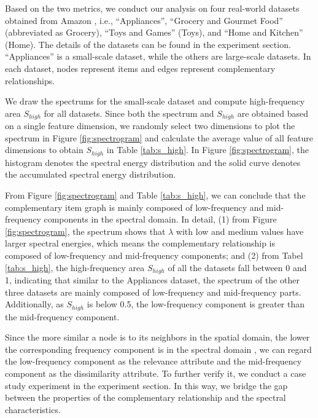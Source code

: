 \documentclass[letterpaper]{article} %
\begin{document}
Based on the two metrics, we conduct our analysis on four real-world datasets obtained from Amazon \cite{he2016ups}, i.e., ``Appliances'', ``Grocery and Gourmet Food'' (abbreviated as Grocery), ``Toys and Games'' (Toys), and ``Home and Kitchen'' (Home). The details of the datasets can be found in the experiment section. ``Appliances'' is a small-scale dataset, while the others are large-scale datasets. In each dataset, nodes represent items and edges represent complementary relationships. 

We draw the spectrums for the small-scale dataset and compute high-frequency area $S_{high}$ for all datasets. Since both the spectrum and $S_{high}$ are obtained based on a single feature dimension, we randomly select two dimensions to plot the spectrum in Figure \ref{fig:spectrogram} and calculate the average value of all feature dimensions to obtain $S_{high}$ in Table \ref{tab:s_high}. In Figure \ref{fig:spectrogram}, the histogram denotes the spectral energy distribution and the solid curve denotes the accumulated spectral energy distribution.

From Figure \ref{fig:spectrogram} and Table \ref{tab:s_high}, we can conclude that the complementary item graph is mainly composed of low-frequency and mid-frequency components in the spectral domain. In detail, (1) from Figure \ref{fig:spectrogram}, the spectrum shows that $\lambda$ with low and medium values have larger spectral energies, which means the complementary relationship is composed of low-frequency and mid-frequency components; and (2) from Tabel \ref{tab:s_high}, the high-frequency area $S_{high}$ of all the datasets fall between 0 and 1, indicating that similar to the Appliances dataset, the spectrum of the other three datasets are mainly composed of low-frequency and mid-frequency parts. Additionally, as $S_{high}$ is below 0.5, the low-frequency component is greater than the mid-frequency component. 

Since the more similar a node is to its neighbors in the spatial domain, the lower the corresponding frequency component is in the spectral domain \cite{wu2022beyond, bo2021beyond}, we can regard the low-frequency component as the relevance attribute and the mid-frequency component as the dissimilarity attribute. To further verify it, we conduct a case study experiment in the experiment section. In this way, we bridge the gap between the properties of the complementary relationship and the spectral characteristics. 
\end{document}
